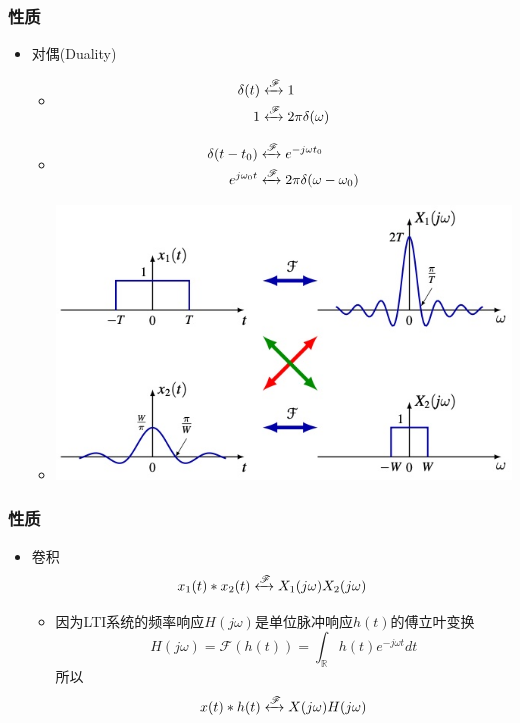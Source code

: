 \documentclass[CJKutf8,dvipsnames,table]{beamer}
\begin{document}
\begin{CJK*}{UTF8}{song}
  \begin{frame}
    \frametitle{性质}
    \begin{itemize}
    \item 对偶(Duality)
    	\begin{itemize}
		\item
\begin{align*}
    \delta(t) & \xleftrightarrow{\mathscr{F}} 1  \\        
        1 & \xleftrightarrow{\mathscr{F}} 2\pi\delta(\omega) 
\end{align*}    
		\item
\begin{align*}
\delta(t-t_0) & \xleftrightarrow{\mathscr{F}} e^{-j\omega t_0} \\
e^{j\omega_0 t} & \xleftrightarrow{\mathscr{F}} 2\pi\delta(\omega-\omega_0) 
\end{align*}   

		\item    
    		\begin{center}
      		\includegraphics[scale=.3]{ftduality}
    		\end{center}
		\end{itemize}      
    \end{itemize}

  \end{frame}    

	
  \begin{frame}
    \frametitle{性质}
    \begin{itemize}
    \item 卷积
    \[
    	x_1(t) \ast x_2(t) \xleftrightarrow{\mathscr{F}} X_1(j\omega)X_2(j\omega)
    \]
    	\begin{itemize}
		\item 因为LTI系统的频率响应$H(j\omega)$是单位脉冲响应$h(t)$的傅立叶变换
		\[
			H(j\omega)=\mathscr{F}(h(t))=\int_{\mathbb{R}}h(t)e^{-j\omega t}dt
		\]
		所以
		\[
			x(t) \ast h(t) \xleftrightarrow{\mathscr{F}} X(j\omega)H(j\omega)
		\]
    	\end{itemize}


\end{itemize}
\end{frame}
\end{CJK*}
\end{document}
